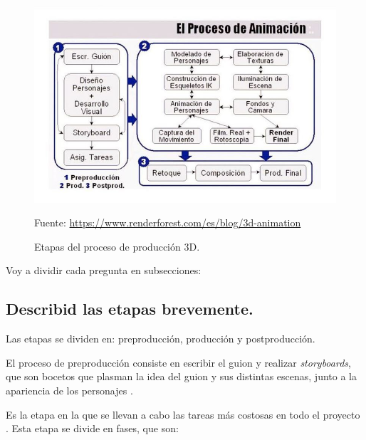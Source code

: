 \documentclass{article}
\begin{document}
\begin{figure}[H]
   \centering
   \includegraphics[width=\textwidth]{imagenes/prod.png}
   \caption{Etapas del proceso de producción 3D.}
   \vspace{10pt}
   \footnotesize{Fuente: \url{https://www.renderforest.com/es/blog/3d-animation}}
\end{figure}


Voy a dividir cada pregunta en subsecciones:

\subsection{Describid las etapas brevemente.}
Las etapas se dividen en: preproducción, producción y postproducción.

\bigskip

El proceso de preproducción consiste en escribir el guion y realizar \textit{storyboards}, que son bocetos que plasman la idea del guion y sus distintas escenas, junto a la apariencia de los personajes \cite{diapos}.

\bigskip

Es la etapa en la que se llevan a cabo las tareas más costosas en todo el proyecto \cite{uclm}. Esta etapa se divide en fases, que son:
\end{document}
